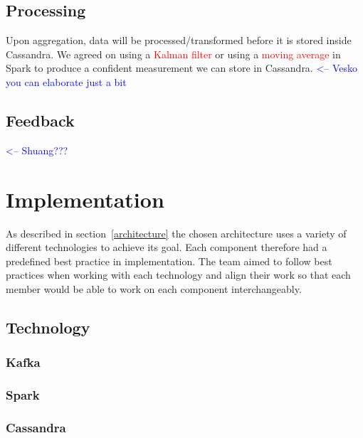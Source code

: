 \documentclass[prodmode,acmtosem]{acmsmall} %
\begin{document}
\subsection{Processing}
Upon aggregation, data will be processed/transformed before it is stored inside Cassandra. We agreed on using a \textcolor{red}{Kalman filter} or using a \textcolor{red}{moving average} in Spark to produce a confident measurement we can store in Cassandra. \textcolor{blue}{<-- Vesko you can elaborate just a bit}

\subsection{Feedback}
\textcolor{blue}{<-- Shuang???}


\section{Implementation}
As described in section~\ref{architecture} the chosen architecture uses a variety of different technologies to achieve its goal. Each component therefore had a predefined best practice in implementation. The team aimed to follow best practices when working with each technology and align their work so that each member would be able to work on each component interchangeably.

\subsection{Technology}

\subsubsection{Kafka}
\subsubsection{Spark}
\subsubsection{Cassandra}
\end{document}
